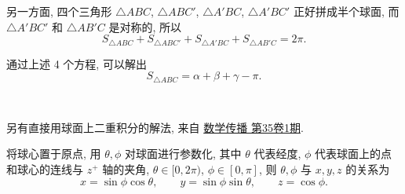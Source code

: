 另一方面, 四个三角形 $\triangle ABC$, $\triangle ABC'$, $\triangle A'BC$, $\triangle A'BC'$ 正好拼成半个球面, 而 $\triangle A'BC'$ 和 $\triangle AB'C$ 是对称的, 所以
\[S_{\triangle ABC} + S_{\triangle ABC'} + S_{\triangle A'BC} + S_{\triangle AB'C} = 2\pi .\]

通过上述 4 个方程, 可以解出
\[S_{\triangle ABC} = \alpha + \beta + \gamma - \pi .\]

~

\noindent 另有直接用球面上二重积分的解法, 来自 \href{https://web.math.sinica.edu.tw/math_media/d351/35105.pdf}{数学传播 第35卷1期}.

将球心置于原点, 用 $\theta,\phi$ 对球面进行参数化, 其中 $\theta$ 代表经度, $\phi$ 代表球面上的点和球心的连线与 $z^+$ 轴的夹角, $\theta\in[0,2\pi)$, $\phi\in[0,\pi]$, 则 $\theta, \phi$ 与 $x,y,z$ 的关系为
\[x = \sin\phi \cos\theta, \qquad y = \sin\phi \sin\theta, \qquad z = \cos\phi .\]

